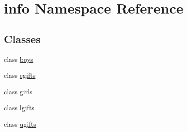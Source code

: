 \hypertarget{namespaceinfo}{}\section{info Namespace Reference}
\label{namespaceinfo}
\subsection*{Classes}
\begin{DoxyCompactItemize}
\item 
class \hyperlink{classinfo_1_1boys}{boys}
\item 
class \hyperlink{classinfo_1_1egifts}{egifts}
\item 
class \hyperlink{classinfo_1_1girls}{girls}
\item 
class \hyperlink{classinfo_1_1lgifts}{lgifts}
\item 
class \hyperlink{classinfo_1_1ugifts}{ugifts}
\end{DoxyCompactItemize}
